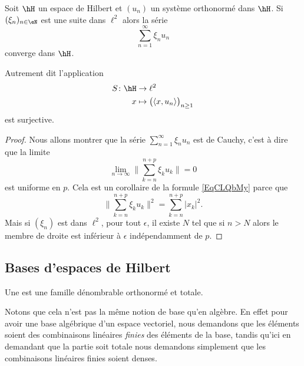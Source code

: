 \begin{proposition}     \label{PropzaKXHq}
    Soit \( \hH\) un espace de Hilbert et \( (u_n)\) un système orthonormé dans \( \hH\). Si \( (\xi_n)_{n\in \eN}\) est une suite dans \( \ell^2\) alors la série 
    \begin{equation}
        \sum_{n=1}^{\infty}\xi_nu_n
    \end{equation}
    converge dans \( \hH\).

    Autrement dit l'application
    \begin{equation}
        \begin{aligned}
            S\colon \hH&\to \ell^2 \\
            x&\mapsto \big( \langle x, u_n\rangle  \big)_{n\geq 1} 
        \end{aligned}
    \end{equation}
    est surjective.
\end{proposition}

\begin{proof}
    Nous allons montrer que la série \( \sum_{n=1}^{\infty}\xi_nu_n\) est de Cauchy, c'est à dire que la limite
    \begin{equation}
        \lim_{n\to \infty} \big\| \sum_{k=n}^{n+p}\xi_ku_k \big\|=0
    \end{equation}
    est uniforme en \( p\). Cela est un corollaire de la formule \eqref{EqCLQbMy} parce que
    \begin{equation}
        \big\| \sum_{k=n}^{n+p}\xi_ku_k \big\|^2=\sum_{k=n}^{n+p}| x_k |^2.
    \end{equation}
    Mais si \( (\xi_n)\) est dans \( \ell^2\), pour tout \( \epsilon\), il existe \( N\) tel que si \( n>N\) alors le membre de droite est inférieur à \( \epsilon\) indépendamment de \( p\).
\end{proof}

\subsection{Bases d'espaces de Hilbert}
\label{SubsecDxkjut}

\begin{definition}
    Une  est une famille dénombrable orthonormé et totale.
\end{definition}
Notons que cela n'est pas la même notion de base qu'en algèbre. En effet pour avoir une base algébrique d'un espace vectoriel, nous demandons que les éléments soient des combinaisons linéaires \emph{finies} des éléments de la base, tandis qu'ici en demandant que la partie soit totale nous demandons simplement que les combinaisons linéaires finies soient denses.

